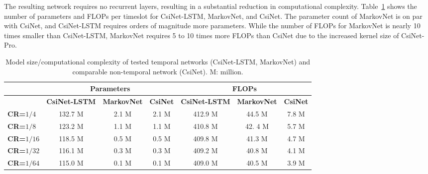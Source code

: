 The resulting network requires no recurrent layers, resulting in a substantial reduction in computational complexity. Table~\ref{tab:comp-complex} shows the number of parameters and FLOPs per timeslot for CsiNet-LSTM, MarkovNet, and CsiNet. The parameter count of MarkovNet is on par with CsiNet, and CsiNet-LSTM requires orders of magnitude more parameters. While the number of FLOPs for MarkovNet is nearly 10 times smaller than CsiNet-LSTM, MarkovNet requires 5 to 10 times more FLOPs than CsiNet due to the increased kernel size of CsiNet-Pro.

\begin{table}[htb]
  \renewcommand{\arraystretch}{1}
  \begin{center}
  \caption{Model size/computational complexity of tested temporal networks (CsiNet-LSTM, MarkovNet) and comparable non-temporal network (CsiNet). M: million.}
  \label{tab:comp-complex} 
  \footnotesize{
	  \begin{tabular}{|l|c|c|c|c|c|c|}
	  \hline
	                              & \multicolumn{3}{c|}{\textbf{Parameters}} & \multicolumn{3}{c|}{\textbf{FLOPs}} \\ \hline
	                              & \textbf{CsiNet-LSTM} & \textbf{MarkovNet} & \textbf{CsiNet} & \textbf{CsiNet-LSTM} & \textbf{MarkovNet} & \textbf{CsiNet} \\ \hline
	  \textbf{CR=$1/4$}  		  & 132.7 M              & 2.1 M              & 2.1 M  			& 412.9 M              & 44.5 M             & 7.8 M           \\ \hline
	  \textbf{CR=$1/8$}  		  & 123.2 M              & 1.1 M              & 1.1 M  			& 410.8 M              & 42.	4 M             & 5.7 M           \\ \hline
	  \textbf{CR=$1/16$} 		  & 118.5 M              & 0.5 M              & 0.5 M 			& 409.8 M              & 41.3 M             & 4.7 M           \\ \hline
	  \textbf{CR=$1/32$} 		  & 116.1 M              & 0.3 M              & 0.3 M           & 409.2 M              & 40.8 M             & 4.1 M           \\ \hline
	  \textbf{CR=$1/64$} 		  & 115.0 M              & 0.1 M              & 0.1 M 			& 409.0 M              & 40.5 M             & 3.9 M           \\ \hline
	  \end{tabular}
  }
  \end{center}
\end{table} 

